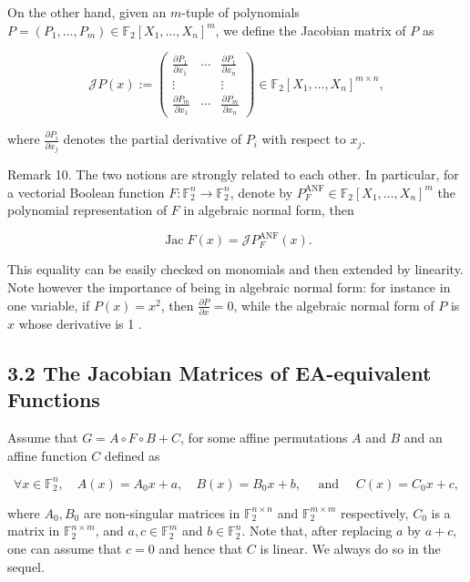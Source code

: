 \documentclass[10pt]{article}
\begin{document}
On the other hand, given an $m$-tuple of polynomials $P=\left(P_{1}, \ldots, P_{m}\right) \in \mathbb{F}_{2}\left[X_{1}, \ldots, X_{n}\right]^{m}$, we define the Jacobian matrix of $P$ as

$$
\mathscr{J} P(x):=\left(\begin{array}{ccc}
\frac{\partial P_{1}}{\partial x_{1}} & \cdots & \frac{\partial P_{1}}{\partial x_{n}} \\
\vdots & & \vdots \\
\frac{\partial P_{m}}{\partial x_{1}} & \cdots & \frac{\partial P_{m}}{\partial x_{n}}
\end{array}\right) \in \mathbb{F}_{2}\left[X_{1}, \ldots, X_{n}\right]^{m \times n},
$$

where $\frac{\partial P_{i}}{\partial x_{j}}$ denotes the partial derivative of $P_{i}$ with respect to $x_{j}$.

Remark 10. The two notions are strongly related to each other. In particular, for a vectorial Boolean function $F: \mathbb{F}_{2}^{n} \rightarrow \mathbb{F}_{2}^{n}$, denote by $P_{F}^{\mathrm{ANF}} \in \mathbb{F}_{2}\left[X_{1}, \ldots, X_{n}\right]^{m}$ the polynomial representation of $F$ in algebraic normal form, then

$$
\operatorname{Jac} F(x)=\mathscr{J} P_{F}^{\mathrm{ANF}}(x) .
$$

This equality can be easily checked on monomials and then extended by linearity.\\
Note however the importance of being in algebraic normal form: for instance in one variable, if $P(x)=x^{2}$, then $\frac{\partial P}{\partial x}=0$, while the algebraic normal form of $P$ is $x$ whose derivative is 1 .

\subsection*{3.2 The Jacobian Matrices of EA-equivalent Functions}
Assume that $G=A \circ F \circ B+C$, for some affine permutations $A$ and $B$ and an affine function $C$ defined as

$$
\forall x \in \mathbb{F}_{2}^{n}, \quad A(x)=A_{0} x+a, \quad B(x)=B_{0} x+b, \quad \text { and } \quad C(x)=C_{0} x+c,
$$

where $A_{0}, B_{0}$ are non-singular matrices in $\mathbb{F}_{2}^{n \times n}$ and $\mathbb{F}_{2}^{m \times m}$ respectively, $C_{0}$ is a matrix in $\mathbb{F}_{2}^{n \times m}$, and $a, c \in \mathbb{F}_{2}^{m}$ and $b \in \mathbb{F}_{2}^{n}$. Note that, after replacing $a$ by $a+c$, one can assume that $c=0$ and hence that $C$ is linear. We always do so in the sequel.
\end{document}
